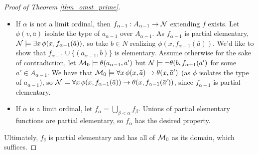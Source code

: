 \begin{proof}[Proof of Theorem \ref{thm_omst_prime}]
\begin{itemize}
\item If \(\alpha\) is not a limit ordinal, then \(f_{\alpha-1}: A_{\alpha-1} \to \mathcal{N}\) extending \(f\) exists. 
Let \(\phi(v, \bar{a})\) isolate the type of \(a_{\alpha-1}\) over \(A_{\alpha-1}\). 
As \(f_{\alpha-1}\) is partial elementary, \(\mathcal{N} \models \exists x \, \phi(x, f_{\alpha-1}(\bar{a}))\), so take \(b \in N\) realizing \(\phi(x, f_{\alpha-1}(\bar{a}))\).
We'd like to show that \(f_{\alpha-1} \cup \{(a_{\alpha-1}, b)\}\) is elementary. 
Assume otherwise for the sake of contradiction, let \(\mathcal{M}_0 \models \theta(a_{\alpha-1}, \bar{a}')\) but \(\mathcal{N} \models \neg\theta(b, f_{\alpha-1}(\bar{a}')\) for some \(\bar{a}' \in A_{\alpha-1}\). 
We have that \(\mathcal{M}_0 \models \forall x \, \phi(x, \bar{a}) \to \theta(x, \bar{a}')\) (as \(\phi\) isolates the type of \(a_{\alpha-1}\)), so \(\mathcal{N}\models\forall x \, \phi(x, f_{\alpha-1}(\bar{a})) \to \theta(x, f_{\alpha-1}(\bar{a}'))\), since \(f_{\alpha-1}\) is partial elementary.

\item If \(\alpha\) is a limit ordinal, let \(f_\alpha = \bigcup\limits_{\beta < \alpha}f_\beta\). Unions of partial elementary functions are partial elementary, so \(f_\alpha\) has the desired property.
\end{itemize}
\noindent Ultimately, \(f_\delta\) is partial elementary and has all of \(\mathcal{M}_0\) as its domain, which suffices. 
\end{proof}
